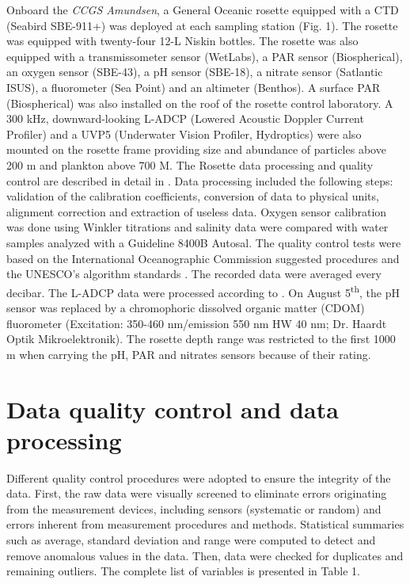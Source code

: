 \documentclass[essd, manuscript]{copernicus}
\begin{document}
Onboard the \textit{CCGS Amundsen}, a General Oceanic rosette equipped with a CTD (Seabird SBE-911+) was deployed at each sampling station (Fig. 1). The rosette was equipped with twenty-four 12-L Niskin bottles. The rosette was also equipped with a transmissometer sensor (WetLabs), a PAR sensor (Biospherical), an oxygen sensor (SBE-43), a pH sensor (SBE-18), a nitrate sensor (Satlantic ISUS), a fluorometer (Sea Point) and an altimeter (Benthos). A surface PAR (Biospherical) was also installed on the roof of the rosette control laboratory. A 300 kHz, downward-looking L-ADCP (Lowered Acoustic Doppler Current Profiler) and a UVP5 (Underwater Vision Profiler, Hydroptics) were also mounted on the rosette frame providing size and abundance of particles above 200 \textmu{}m and plankton above 700 \textmu{}M. The Rosette data processing and quality control are described in detail in \citet{Guillot2010}. Data processing included the following steps: validation of the calibration coefficients, conversion of data to physical units, alignment correction and extraction of useless data. Oxygen sensor calibration was done using Winkler titrations and salinity data were compared with water samples analyzed with a Guideline 8400B Autosal. The quality control tests were based on the International Oceanographic Commission suggested procedures and the UNESCO’s algorithm standards \citep{UNESCO1993}. The recorded data were averaged every decibar. The L-ADCP data were processed according to \citet{Visbeck2002}. On August 5\textsuperscript{th}, the pH sensor was replaced by a chromophoric dissolved organic matter (CDOM) fluorometer (Excitation: 350-460 nm/emission 550 nm HW 40 nm; Dr. Haardt Optik Mikroelektronik). The rosette depth range was restricted to the first 1000 m when carrying the pH, PAR and nitrates sensors because of their rating.

\section{Data quality control and data processing}

Different quality control procedures were adopted to ensure the integrity of the data. First, the raw data were visually screened to eliminate errors originating from the measurement devices, including sensors (systematic or random) and errors inherent from measurement procedures and methods. Statistical summaries such as average, standard deviation and range were computed to detect and remove anomalous values in the data. Then, data were checked for duplicates and remaining outliers. The complete list of variables is presented in Table 1.
\end{document}
